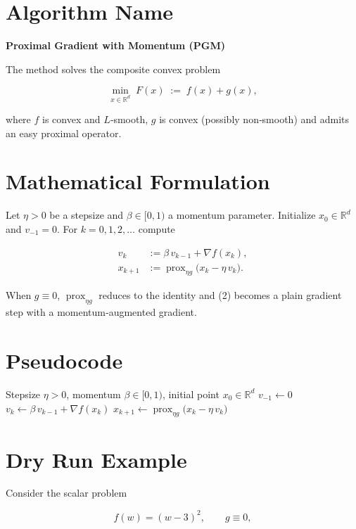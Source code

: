 \documentclass{article}
\newcommand{\prox}{\operatorname{prox}}
\newcommand{\R}{\mathbb{R}}
\begin{document}
\section*{Algorithm Name}
\textbf{Proximal Gradient with Momentum (PGM)}  

The method solves the composite convex problem  

\[
\min_{x\in\R^{d}} \; F(x)\;:=\; f(x)+g(x),
\]

where $f$ is convex and $L$‑smooth, $g$ is convex (possibly non‑smooth) and admits an easy proximal operator.

\section*{Mathematical Formulation}
Let $\eta>0$ be a stepsize and $\beta\in[0,1)$ a momentum parameter.  
Initialize $x_{0}\in\R^{d}$ and $v_{-1}=0$. For $k=0,1,2,\dots$ compute  

\[
\begin{aligned}
v_{k}      &:= \beta\,v_{k-1} + \nabla f(x_{k}) , \tag{1}\\[4pt]
x_{k+1}    &:= \prox_{\eta g}\bigl(x_{k}-\eta\, v_{k}\bigr). \tag{2}
\end{aligned}
\]

When $g\equiv0$, $\prox_{\eta g}$ reduces to the identity and (2) becomes a plain gradient step with a momentum‑augmented gradient.

\section*{Pseudocode}
\begin{algorithm}[H]
\caption{Proximal Gradient with Momentum (PGM)}
\begin{algorithmic}[1]
\Require Stepsize $\eta>0$, momentum $\beta\in[0,1)$, initial point $x_{0}\in\R^{d}$
\State $v_{-1}\gets 0$
    \State $v_{k}\gets \beta\,v_{k-1}+ \nabla f(x_{k})$ 
    \State $x_{k+1}\gets \prox_{\eta g}\!\bigl(x_{k}-\eta\,v_{k}\bigr)$ 
\EndFor
\end{algorithmic}
\end{algorithm}

\section*{Dry Run Example}
Consider the scalar problem  

\[
f(w)=(w-3)^{2},\qquad g\equiv0,
\]
\end{document}
